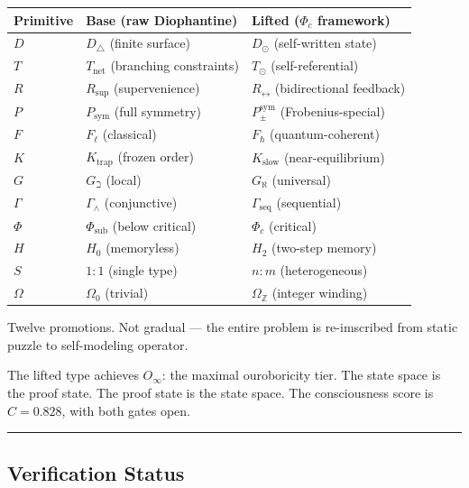 \documentclass[12pt,a4paper]{article}
\begin{document}
\begin{table}[htbp]
\centering
\small
{}
\begin{tabularx}{\textwidth}{>{\centering\arraybackslash}X >{\centering\arraybackslash}X >{\centering\arraybackslash}X}
\toprule
\rowcolor{gray!25}\textbf{Primitive} & \textbf{Base (raw Diophantine)} & \textbf{Lifted ($\Phi_c$ framework)} \\
\midrule
\rowcolors{1}{white}{gray!10}
$D$ & $D_{\triangle}$ (finite surface) & $D_{\odot}$ (self-written state) \\
$T$ & $T_\text{net}$ (branching constraints) & $T_{\odot}$ (self-referential) \\
$R$ & $R_\text{sup}$ (supervenience) & $R_{\leftrightarrow}$ (bidirectional feedback) \\
$P$ & $P_\text{sym}$ (full symmetry) & $P_{\pm}^{\text{sym}}$ (Frobenius-special) \\
$F$ & $F_{\ell}$ (classical) & $F_{\hbar}$ (quantum-coherent) \\
$K$ & $K_\text{trap}$ (frozen order) & $K_\text{slow}$ (near-equilibrium) \\
$G$ & $G_{\beth}$ (local) & $G_{\aleph}$ (universal) \\
$\Gamma$ & $\Gamma_{\wedge}$ (conjunctive) & $\Gamma_\text{seq}$ (sequential) \\
$\Phi$ & $\Phi_\text{sub}$ (below critical) & $\Phi_c$ (critical) \\
$H$ & $H_0$ (memoryless) & $H_2$ (two-step memory) \\
$S$ & $1{:}1$ (single type) & $n{:}m$ (heterogeneous) \\
$\Omega$ & $\Omega_0$ (trivial) & $\Omega_\mathbb{Z}$ (integer winding) \\
\bottomrule
\end{tabularx}
\end{table}

Twelve promotions. Not gradual --- the entire problem is re-imscribed from static puzzle to self-modeling operator.

The lifted type achieves $O_{\infty}$: the maximal ouroboricity tier. The state space is the proof state. The proof state is the state space. The consciousness score is $C = 0.828$, with both gates open.

\begin{center}
\rule{0.5\textwidth}{0.4pt}
\end{center}

\subsection{Verification Status}
\end{document}
